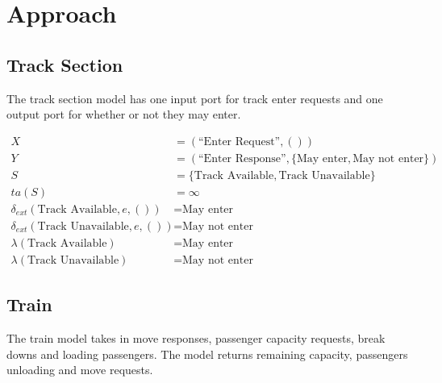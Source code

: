 \section{Approach}

\subsection{Track Section}

The track section model has one input port for track enter requests and one
output port for whether or not they may enter. 

\begin{align*}
    X &= (\text{``Enter Request''}, ()) \\
    Y &= (\text{``Enter Response''}, 
      \{\text{May enter}, \text{May not enter}\})
    \\
    S &= \{\text{Track Available}, \text{Track Unavailable}\} \\
    ta(S) &= \infty \\
    \delta_{ext}(\text{Track Available}, e, ()) &= 
      \text{May enter}  \\
    \delta_{ext}(\text{Track Unavailable}, e, ()) &= 
      \text{May not enter}  \\
    \lambda(\text{Track Available}) &= \text{May enter} \\
    \lambda(\text{Track Unavailable}) &= \text{May not enter}
\end{align*}

\subsection{Train}

The train model takes in move responses, passenger capacity requests, break
downs and loading passengers. The model returns remaining capacity, passengers
unloading and move requests.



\newcommand{\InBreakDown}[0]{(\text{``Breakdown''}, ())}
\newcommand{\InCapReq}[0]{(\text{``Capacity Request''}, ())}
\newcommand{\InMoveRes}[1]{(\text{``Move Response''}, #1)}
\newcommand{\InLoadPassengers}[1]{(\text{``Load Passengers''}, #1)}

\newcommand{\OutRemainingCapacity}[1]{(\text{``Remaining Capacity''}, #1)}
\newcommand{\OutUnloadPassengers}[1]{(\text{``Unload Passengers''}, #1)}
\newcommand{\OutMoveReq}[0]{(\text{``Move Request''}, ())}
\newcommand{\phase}[0]{\text{phase}}

